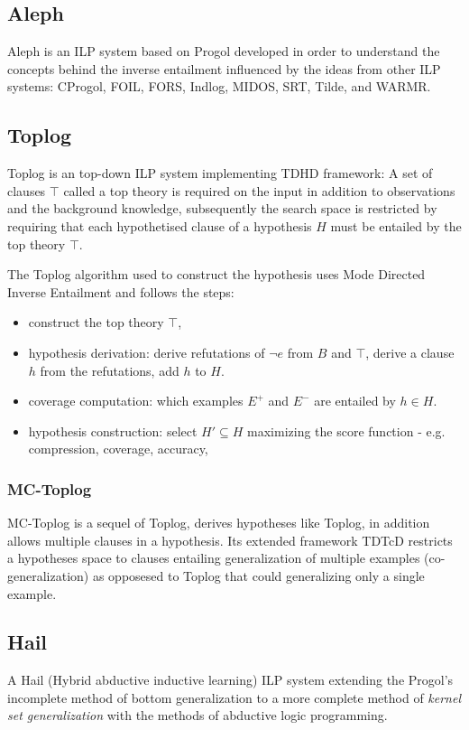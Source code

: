 \subsection{Aleph\cite{aleph2007}}
Aleph is an ILP system based on Progol developed in order to understand the concepts behind the inverse entailment\cite{muggleton1995inverse} influenced by the ideas from other ILP systems: CProgol, FOIL, FORS, Indlog, MIDOS, SRT, Tilde, and WARMR. 

\subsection{Toplog\cite{santos2008toplogWebsite}\cite{muggleton2008toplog}}
Toplog is an top-down ILP system implementing TDHD framework:
A set of clauses $\top$ called a top theory is required on the input in addition to observations and the background knowledge, subsequently the search space is restricted by requiring that each hypothetised clause of a hypothesis $H$ must be entailed by the top theory $\top$.

The Toplog algorithm used to construct the hypothesis uses Mode Directed Inverse Entailment and follows the steps:
\begin{itemize}
\item construct the top theory $\top$,
\item hypothesis derivation: derive refutations of $\neg e$ from $B$ and $\top$, derive a clause $h$ from the refutations, add $h$ to $H$.
\item coverage computation: which examples $E^+$ and $E^-$ are entailed by $h \in H$.
\item hypothesis construction: select $H' \subseteq H$ maximizing the score function - e.g. compression, coverage, accuracy,
\end{itemize}

\subsubsection{MC-Toplog\cite{muggleton2012mc}}
MC-Toplog is a sequel of Toplog, derives hypotheses like Toplog, in addition allows multiple clauses in a hypothesis. Its extended framework TDTcD restricts a hypotheses space to clauses entailing generalization of multiple examples (co-generalization) as opposesed to Toplog that could generalizing only a single example.

\subsection{Hail\cite{ray2003hybrid}\cite{ray2005phdHybrid}}
A Hail (Hybrid abductive inductive learning) ILP system extending the Progol's incomplete method of bottom generalization to a more complete method of \emph{kernel set generalization} with the methods of abductive logic programming.

